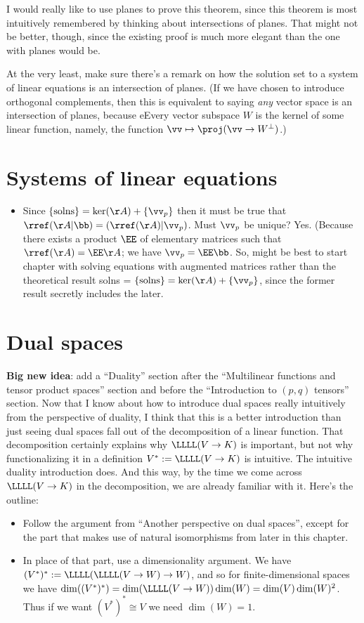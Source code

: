 I would really like to use planes to prove this theorem, since this theorem is most intuitively remembered by thinking about intersections of planes. That might not be better, though, since the existing proof is much more elegant than the one with planes would be.

At the very least, make sure there's a remark on how the solution set to a system of linear equations is an intersection of planes. (If we have chosen to introduce orthogonal complements, then this is equivalent to saying \textit{any} vector space is an intersection of planes, because eEvery vector subspace $W$ is the kernel of some linear function, namely, the function $\vv \mapsto \proj(\vv \rightarrow W^\perp)$.)

\section*{Systems of linear equations}

\begin{itemize}
    \item Since $\{\text{solns}\} = \ker(\AA) + \{\vv_p\}$ then it must be true that $\rref(\AA | \bb) = (\rref(\AA) | \vv_p)$. Must $\vv_p$ be unique? Yes. (Because there exists a product $\EE$ of elementary matrices such that $\rref(\AA) = \EE \AA$; we have $\vv_p = \EE \bb$. So, might be best to start chapter with solving equations with augmented matrices rather than the theoretical result solns = $\{\text{solns}\} = \ker(\AA) + \{\vv_p\}$, since the former result secretly includes the later.
\end{itemize}

\section*{Dual spaces}

\textbf{Big new idea}: add a ``Duality'' section after the ``Multilinear functions and tensor product spaces'' section and before the ``Introduction to $(p, q)$ tensors'' section. Now that I know about how to introduce dual spaces really intuitively from the perspective of duality, I think that this is a better introduction than just seeing dual spaces fall out of the decomposition of a linear function. That decomposition certainly explains why $\LLLL(V \rightarrow K)$ is important, but not why functionalizing it in a definition $V^* := \LLLL(V \rightarrow K)$ is intuitive. The intuitive duality introduction does. And this way, by the time we come across $\LLLL(V \rightarrow K)$ in the decomposition, we are already familiar with it. Here's the outline:
\begin{itemize}
	\item Follow the argument from ``Another perspective on dual spaces'', except for the part that makes use of natural isomorphisms from later in this chapter.
	\item In place of that part, use a dimensionality argument. We have $(V^*)^* := \LLLL(\LLLL(V \rightarrow W) \rightarrow W)$, and so for finite-dimensional spaces we have $\dim((V^*)^*) = \dim(\LLLL(V \rightarrow W))\dim(W) = \dim(V)\dim(W)^2$. Thus if we want $(V^*)^* \cong V$ we need $\dim(W) = 1$.
\end{itemize}

